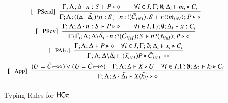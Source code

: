 \begin{figure}[!t]
\[\begin{array}{c}
		\trule{PSend}~~\tree{
			\Gamma; \Lambda; \Delta \cat n: S \proves P \hastype \Proc \qquad \forall i \in I, \Gamma; \es; \Delta_i \proves m_i \hastype C_i
		}{
			\Gamma; \Lambda; ((\Delta\cat\tilde{\Delta_i})\backslash n:S) \cat n: \btout{\tilde{C_i}_{i \in I}} S\proves \bout{n}{\tilde{m_i}_{i \in I}} P \hastype \Proc
		}
		\\[4mm]

		\trule{PRcv}~~\tree{
			\Gamma; \Lambda; \Delta \cat n: S \proves P \hastype \Proc \qquad \forall i \in I, \Gamma_i; \es; \Delta_i \proves x: C_i 
		}{
			\Gamma\backslash\tilde{\Gamma_i}; \Lambda; \Delta\backslash\tilde{\Delta_i} \cat n: \btinp{\tilde{C_i}_{i \in I}} S \proves \binp{n}{\tilde{x_i}_{i \in I}} P \hastype \Proc
		}
		\\[4mm]

		\trule{PAbs}~~\tree{
			\Gamma; \Lambda; \Delta \proves P \hastype \Proc \quad \forall i \in I, \Gamma; \es; \Delta_i \proves x_i \hastype C_i
		}{
			\Gamma; \Lambda; \Delta\backslash\tilde{\Delta_i} \proves \abs{\tilde{x_i}_{i \in I}}{P} \hastype \lhot{\tilde{C_i}_{i \in I}}
		}
		\\[4mm]

		\trule{App}~~\tree{(U = \lhot{\tilde{C_i}}) \lor (U = \shot{\tilde{C_i}}) \quad
			\Gamma; \Lambda; \Delta \proves X \hastype U  \quad \forall i \in I, \Gamma; \es; \Delta_2 \proves k_i \hastype C_i
		}{
			\Gamma; \Lambda; \Delta \cat \tilde{\Delta_i} \proves \appl{X}{\tilde{k_i}} \hastype \Proc
		} 
		\\[4mm]
	\end{array}
\]
\caption{Typing Rules for $\mathsf{HO}\pi$\label{fig:typerulesmy}}
\end{figure}
